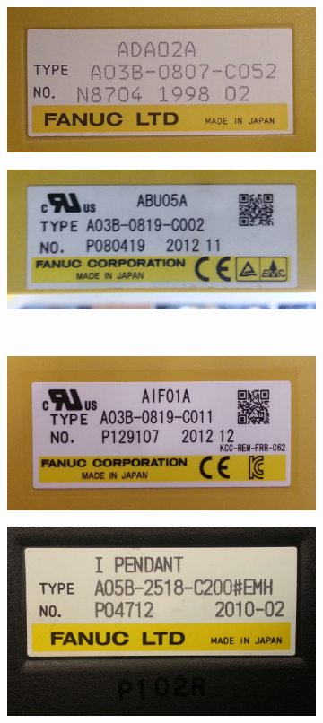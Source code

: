 \begin{figure}
    \centering
    \begin{subfigure}{.5\textwidth}
        \centering
        \includegraphics[width=.8\linewidth]{figures/stickers/ao}
    \end{subfigure}%
    \begin{subfigure}{.5\textwidth}
        \centering
        \includegraphics[width=.8\linewidth]{figures/stickers/backplane}
    \end{subfigure} \\
    \begin{subfigure}{.5\textwidth}
        \centering
        \includegraphics[width=.8\linewidth]{figures/stickers/io-unit}
    \end{subfigure}%
    \begin{subfigure}{.5\textwidth}
        \centering
        \includegraphics[width=.8\linewidth]{figures/stickers/tp}

\end{subfigure}
\end{figure}
